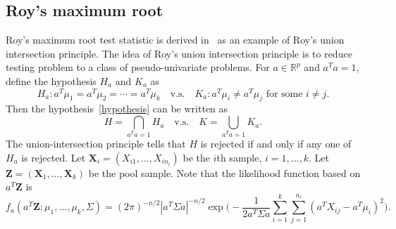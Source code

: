 \documentclass[review]{elsarticle}
\newcommand{\bZ}{\mathbf{Z}}
\newcommand{\bX}{\mathbf{X}}
\theoremstyle{plain}
\theoremstyle{definition}
\theoremstyle{remark}
\begin{document}
\subsection{Roy's maximum root}
Roy's maximum root test statistic is derived in~\cite{Roy1953} as an example of Roy's union intersection principle.
The idea of Roy's union intersection principle is to reduce testing problem to a class of pseudo-univariate problems.
For $a\in \mathbb{R}^p$ and $a^T a=1$, define the hypothesis $H_a$ and $K_a$ as
$$
H_a: a^T\mu_1=a^T\mu_2=\cdots=a^T\mu_k\quad \text{v.s.}\quad K_a: \text{$a^T\mu_i\neq a^T\mu_j$ for some $i\neq j$}.
$$
Then the hypothesis~\eqref{hypothesis} can be written as 
$$H=\bigcap_{a^T a =1}H_a\quad \text{v.s.}\quad K=\bigcup_{a^T a=1} K_a.$$
The union-intersection principle tells that $H$ is rejected if and only if any one of $H_a$ is rejected.
Let $\bX_i=(X_{i1},\ldots,X_{in_i})$ be the $i$th sample, $i=1,\ldots,k$. Let $\bZ=(\bX_1,\ldots,\bX_k)$ be the pool sample.
Note that the likelihood function based on $a^T \bZ$ is 
$$
f_a(a^T \bZ;\mu_1,\ldots,\mu_k,\Sigma)=
    (2\pi)^{-n/2}|a^T \Sigma a|^{-n/2}\exp\Big(-\frac{1}{2 a^T \Sigma a}\sum_{i=1}^k\sum_{j=1}^{n_i}(a^T X_{ij}-a^T\mu_i)^2\Big).
$$
\end{document}
